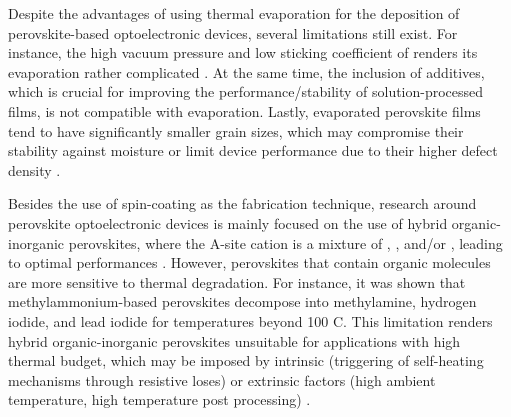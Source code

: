 Despite the advantages of using thermal evaporation for the deposition of perovskite-based optoelectronic devices, several limitations still exist. For instance, the high vacuum pressure and low sticking coefficient of  renders its evaporation rather complicated \cite{Kim2020DepositionPerovskite}. At the same time, the inclusion of additives, which is crucial for improving the performance/stability of solution-processed films, is not compatible with evaporation. Lastly, evaporated perovskite films tend to have significantly smaller grain sizes, which may compromise their stability against moisture or limit device performance due to their higher defect density \cite{Vaynzof2020TheProcessing, Wang2017ScalingFilms}.


Besides the use of spin-coating as the fabrication technique, research around perovskite optoelectronic devices is mainly focused on the use of hybrid organic-inorganic perovskites, where the A-site cation is a mixture of , , and/or , leading to optimal performances \cite{Zhang2021All-inorganicCells}. However, perovskites that contain organic molecules are more sensitive to thermal degradation. For instance, it was shown that methylammonium-based perovskites decompose into methylamine, hydrogen iodide, and lead iodide for temperatures beyond 100 \degree C. This limitation renders hybrid organic-inorganic perovskites unsuitable for applications with high thermal budget, which may be imposed by intrinsic (triggering of self-heating mechanisms through resistive loses) or extrinsic factors (high ambient temperature, high temperature post processing) \cite{Handa2019LargePerovskite, Dong2023GrowthFilm, Li2022StructureTemperatures}. 

